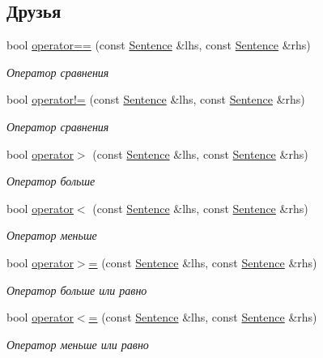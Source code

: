 \subsection*{Друзья}
\begin{DoxyCompactItemize}
\item 
bool \hyperlink{classJarvis_1_1Sentence_a6ecb6a1aa4a36b15b8871048ec240467}{operator==} (const \hyperlink{classJarvis_1_1Sentence}{Sentence} \&lhs, const \hyperlink{classJarvis_1_1Sentence}{Sentence} \&rhs)
\begin{DoxyCompactList}\small\item\em Оператор сравнения \end{DoxyCompactList}\item 
bool \hyperlink{classJarvis_1_1Sentence_ab281eae311e630f9dca86a48fc608518}{operator!=} (const \hyperlink{classJarvis_1_1Sentence}{Sentence} \&lhs, const \hyperlink{classJarvis_1_1Sentence}{Sentence} \&rhs)
\begin{DoxyCompactList}\small\item\em Оператор сравнения \end{DoxyCompactList}\item 
bool \hyperlink{classJarvis_1_1Sentence_a90cda2640b9dadd4b19c9baae07fe55d}{operator$>$} (const \hyperlink{classJarvis_1_1Sentence}{Sentence} \&lhs, const \hyperlink{classJarvis_1_1Sentence}{Sentence} \&rhs)
\begin{DoxyCompactList}\small\item\em Оператор больше \end{DoxyCompactList}\item 
bool \hyperlink{classJarvis_1_1Sentence_ad8bc9f0888e1331f783f7a8e1765403f}{operator$<$} (const \hyperlink{classJarvis_1_1Sentence}{Sentence} \&lhs, const \hyperlink{classJarvis_1_1Sentence}{Sentence} \&rhs)
\begin{DoxyCompactList}\small\item\em Оператор меньше \end{DoxyCompactList}\item 
bool \hyperlink{classJarvis_1_1Sentence_a4e0a564a452ba4172bd0d718c04ea7e0}{operator$>$=} (const \hyperlink{classJarvis_1_1Sentence}{Sentence} \&lhs, const \hyperlink{classJarvis_1_1Sentence}{Sentence} \&rhs)
\begin{DoxyCompactList}\small\item\em Оператор больше или равно \end{DoxyCompactList}\item 
bool \hyperlink{classJarvis_1_1Sentence_af9d0c048412448422e8af2e420a0be48}{operator$<$=} (const \hyperlink{classJarvis_1_1Sentence}{Sentence} \&lhs, const \hyperlink{classJarvis_1_1Sentence}{Sentence} \&rhs)
\begin{DoxyCompactList}\small\item\em Оператор меньше или равно \end{DoxyCompactList}\end{DoxyCompactItemize}


